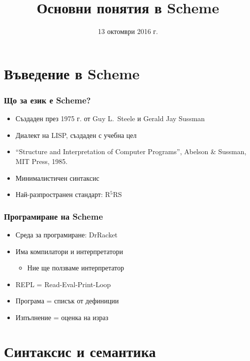 \documentclass{beamer}
\title{Основни понятия в Scheme}
\date{13 октомври 2016 г.}
\begin{document}
\begin{frame}
  \titlepage
\end{frame}

\section{Въведение в Scheme}

\begin{frame}
  \frametitle{Що за език е Scheme?}

  \begin{itemize}
  \item Създаден през 1975 г. от Guy L.~Steele и  Gerald Jay Sussman
  \item Диалект на LISP, създаден с учебна цел
  \item ``Structure and Interpretation of Computer Programs'', Abelson \& Sussman, MIT Press, 1985.
  \item Минималистичен синтаксис
  \item Най-разпространен стандарт: R$^5$RS
  \end{itemize}
\end{frame}

\begin{frame}
  \frametitle{Програмиране на Scheme}

  \begin{itemize}
  \item Среда за програмиране: DrRacket
  \item Има компилатори и интерпретатори
    \begin{itemize}
    \item Ние ще ползваме интерпретатор
    \end{itemize}
  \item REPL = Read-Eval-Print-Loop
  \item Програма = списък от дефиниции
  \item Изпълнение = оценка на израз
  \end{itemize}
\end{frame}

\section{Синтаксис и семантика}
\end{document}
